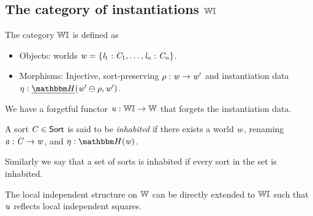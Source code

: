 
\subsection[Category of Instantiations]{The category of instantiations $\mathbb{W}\mathbb{I}$}

The category $\mathbb{W}\mathbb{I}$ is defined as
\begin{itemize}
    \item Objects: worlds $\mathit{w} = \{ \mathit{l}_1 : \mathit{C}_1, \dots, \mathit{l}_{\mathit{n}} : \mathit{C}_{\mathit{n}} \}$.
    \item Morphisms: Injective, sort-preserving $\rho : \mathit{w} \to \mathit{w}'$ and instantiation data $\mvarM : \dheapF(\vw' \ominus \rho, \vw')$.
\end{itemize}
We have a forgetful functor $\mathit{u} : \mathbb{W}\mathbb{I} \to \mathbb{W}$ that forgets the instantiation data.

\begin{definition}\label{def:inhabited-sorts}
    A sort $\mathit{C} \in \mathsf{Sort}$ is said to be \emph{inhabited} if
    there exists a world $\mathit{w}$, renaming $\mathit{a} : \mathit{C} \to \mathit{w}$, and $\mvarM : \heapF(\vw)$.
\end{definition}
Similarly we say that a set of sorts is inhabited if every sort in the set is inhabited.

\begin{lemma}\label{lem:lic-instC}
    The local independent structure on $\mathbb{W}$ can be directly extended to $\mathbb{W}\mathbb{I}$ such that $\mathit{u}$ reflects local independent squares.
\end{lemma}

